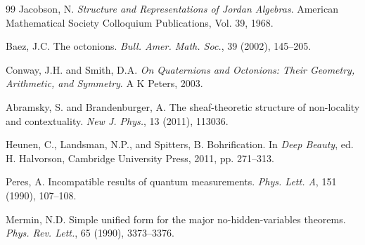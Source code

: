 \documentclass[11pt]{article}
\begin{document}
\begin{thebibliography}{99}
Jacobson, N.
\textit{Structure and Representations of Jordan Algebras}.
American Mathematical Society Colloquium Publications, Vol. 39, 1968.

Baez, J.C.
The octonions.
\textit{Bull. Amer. Math. Soc.}, 39 (2002), 145--205.

Conway, J.H. and Smith, D.A.
\textit{On Quaternions and Octonions: Their Geometry, Arithmetic, and Symmetry}.
A K Peters, 2003.

Abramsky, S. and Brandenburger, A.
The sheaf-theoretic structure of non-locality and contextuality.
\textit{New J. Phys.}, 13 (2011), 113036.

Heunen, C., Landsman, N.P., and Spitters, B.
Bohrification.
In \textit{Deep Beauty}, ed. H. Halvorson, Cambridge University Press, 2011, pp. 271--313.

Peres, A.
Incompatible results of quantum measurements.
\textit{Phys. Lett. A}, 151 (1990), 107--108.

Mermin, N.D.
Simple unified form for the major no-hidden-variables theorems.
\textit{Phys. Rev. Lett.}, 65 (1990), 3373--3376.

\end{thebibliography}
\end{document}
